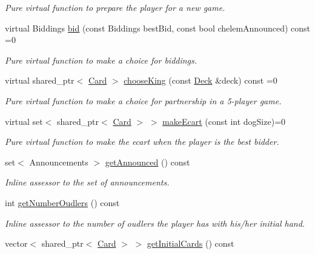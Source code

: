 \begin{DoxyCompactItemize}
\begin{DoxyCompactList}\small\item\em Pure virtual function to prepare the player for a new game. \end{DoxyCompactList}\item 
virtual Biddings \hyperlink{classPlayer_a4bb658ca7b46f32a42578b884ad7fe82}{bid} (const Biddings best\-Bid, const bool chelem\-Announced) const =0
\begin{DoxyCompactList}\small\item\em Pure virtual function to make a choice for biddings. \end{DoxyCompactList}\item 
virtual shared\-\_\-ptr$<$ \hyperlink{classCard}{Card} $>$ \hyperlink{classPlayer_ac85ce39f638b28f13588e8957dc952ff}{choose\-King} (const \hyperlink{classDeck}{Deck} \&deck) const =0
\begin{DoxyCompactList}\small\item\em Pure virtual function to make a choice for partnership in a 5-\/player game. \end{DoxyCompactList}\item 
virtual set$<$ shared\-\_\-ptr$<$ \hyperlink{classCard}{Card} $>$ $>$ \hyperlink{classPlayer_a34c9e9f402c6a68d6e16caebdb93a33f}{make\-Ecart} (const int dog\-Size)=0
\begin{DoxyCompactList}\small\item\em Pure virtual function to make the ecart when the player is the best bidder. \end{DoxyCompactList}\item 
\hypertarget{classPlayer_a5573dd91ddb6fa8874d5a7f7a186f186}{set$<$ Announcements $>$ \hyperlink{classPlayer_a5573dd91ddb6fa8874d5a7f7a186f186}{get\-Announced} () const }\label{classPlayer_a5573dd91ddb6fa8874d5a7f7a186f186}

\begin{DoxyCompactList}\small\item\em Inline assessor to the set of announcements. \end{DoxyCompactList}\item 
\hypertarget{classPlayer_a4dc51cf2a773556eb26f3d47c4274b0a}{int \hyperlink{classPlayer_a4dc51cf2a773556eb26f3d47c4274b0a}{get\-Number\-Oudlers} () const }\label{classPlayer_a4dc51cf2a773556eb26f3d47c4274b0a}

\begin{DoxyCompactList}\small\item\em Inline assessor to the number of oudlers the player has with his/her initial hand. \end{DoxyCompactList}\item 
\hypertarget{classPlayer_aab2cfa2ce2e7a3903ff99ac5c7ef8db6}{vector$<$ shared\-\_\-ptr$<$ \hyperlink{classCard}{Card} $>$ $>$ \hyperlink{classPlayer_aab2cfa2ce2e7a3903ff99ac5c7ef8db6}{get\-Initial\-Cards} () const }\label{classPlayer_aab2cfa2ce2e7a3903ff99ac5c7ef8db6}


\end{DoxyCompactItemize}
